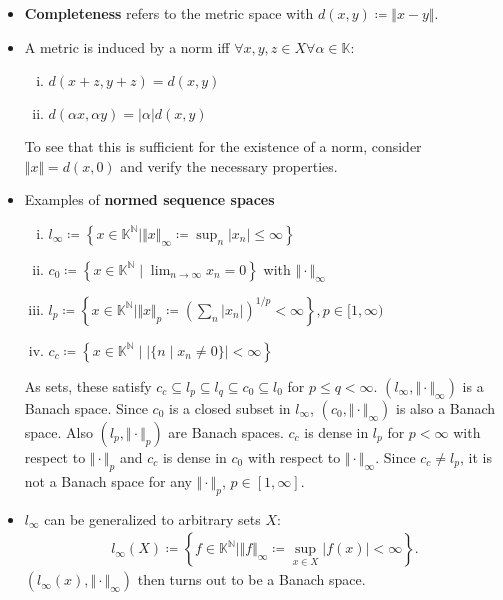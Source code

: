 \documentclass[10pt,a4paper]{article}
\theoremstyle{definition}
\theoremstyle{cor}
\theoremstyle{theorem}
\theoremstyle{lemma}
\theoremstyle{example}
\theoremstyle{remark}
\newcommand{\norm}[1]{\Vert #1 \Vert}
\begin{document}
\begin{itemize}
\item \textbf{Completeness} refers to the metric space with $d(x, y) \coloneqq \norm{x - y}$.
\item A metric is induced by a norm iff $\forall x,y,z \in X \forall\alpha\in\mathbb{K}:$
\begin{enumerate}[(i)]
\item $d(x+z, y+z) = d(x, y)$
\item $d(\alpha x, \alpha y) = |\alpha| d(x, y)$
\end{enumerate}
To see that this is sufficient for the existence of a norm, consider $\norm{x} = d(x , 0)$ and verify the necessary properties. 
\item Examples of \textbf{normed sequence spaces}
\begin{enumerate}[(i)]
\item $l_{\infty} \coloneqq \left\{ x \in \mathbb{K}^{\mathbb{N}} \mid \norm{x}_{\infty} \coloneqq \sup_{n} |x_n| \leq \infty \right\}$
\item $c_0 \coloneqq \left\{ x \in \mathbb{K}^{\mathbb{N}} \mid \lim_{n \rightarrow \infty} x_n = 0 \right\}$ with $\norm{\cdot}_{\infty}$
\item $l_{p} \coloneqq \left\{ x \in \mathbb{K}^{\mathbb{N}} \mid \norm{x}_p \coloneqq \left( \sum_n |x_n| \right)^{1/p} <\infty \right\}, p\in[1, \infty)$
\item $c_c \coloneqq \left\{ x \in \mathbb{K}^{\mathbb{N}} \mid \left| \{n \mid x_n \neq 0\}\right| < \infty \right\} $
\end{enumerate}
As sets, these satisfy $c_c \subseteq l_p \subseteq l_q \subseteq c_0 \subseteq l_0$ for $p \leq q < \infty$. $\left( l_{\infty}, \norm{\cdot}_{\infty} \right)$ is a Banach space. Since $c_0$ is a closed subset in $l_\infty$, $\left(c_0, \norm{\cdot}_{\infty}\right)$ is also a Banach space. Also $\left(l_p, \norm{\cdot}_{p}\right)$ are Banach spaces. $c_c$ is dense in $l_p$ for $p < \infty$ with respect to $\norm{\cdot}_p$ and $c_c$ is dense in $c_0$ with respect to $\norm{\cdot}_{\infty}$. Since $c_c \neq l_p$, it is not a Banach space for any $\norm{\cdot}_p$, $p\in[1, \infty]$.
\item $l_\infty$ can be generalized to arbitrary sets $X$: 
\begin{align*}
l_\infty(X) \coloneqq \left\{ f \in \mathbb{K}^{\mathbb{N}} \mid \norm{f}_\infty \coloneqq \sup_{x \in X} |f(x)| < \infty\right\}.
\end{align*}
$\left(l_\infty(x), \norm{\cdot}_\infty\right)$  then turns out to be a Banach space.

\end{itemize}
\end{document}
